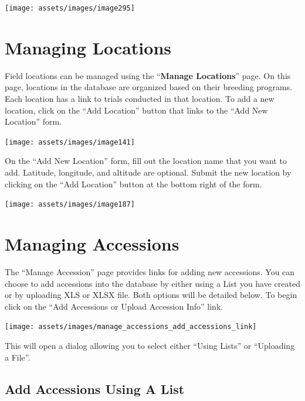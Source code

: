 \documentclass[
  12pt,
]{book}
\begin{document}
\begin{center}\texttt{[image: assets/images/image295]} \end{center}

\hypertarget{managing-locations}{%
\chapter{Managing Locations}\label{managing-locations}}

Field locations can be managed using the ``\textbf{Manage Locations}'' page. On this page, locations in the database are organized based on their breeding programs. Each location has a link to trials conducted in that location. To add a new location, click on the ``Add Location'' button that links to the ``Add New Location'' form.

\begin{center}\texttt{[image: assets/images/image141]} \end{center}

On the ``Add New Location'' form, fill out the location name that you want to add. Latitude, longitude, and altitude are optional. Submit the new location by clicking on the ``Add Location'' button at the bottom right of the form.

\begin{center}\texttt{[image: assets/images/image187]} \end{center}

\hypertarget{managing-accessions}{%
\chapter{Managing Accessions}\label{managing-accessions}}

The ``Manage Accession'' page provides links for adding new accessions. You can choose to add accessions into the database by either using a List you have created or by uploading XLS or XLSX file. Both options will be detailed below. To begin click on the ``Add Accessions or Upload Accession Info'' link.

\begin{center}\texttt{[image: assets/images/manage\_accessions\_add\_accessions\_link]} \end{center}

This will open a dialog allowing you to select either ``Using Lists'' or ``Uploading a File''.

\hypertarget{add-accessions-using-a-list}{%
\section{Add Accessions Using A List}\label{add-accessions-using-a-list}}
\end{document}
